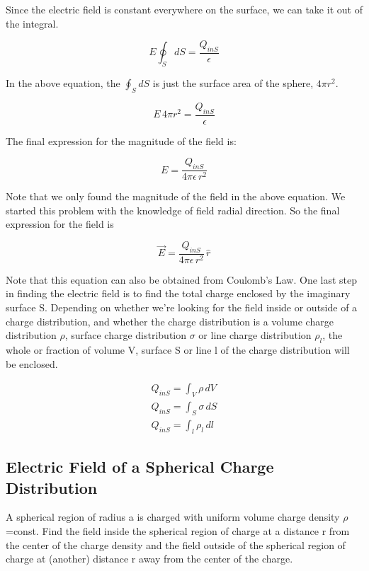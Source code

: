\documentclass{ximera}
\begin{document}
Since the electric field is constant everywhere on the surface, we can take it out of the integral. 


\begin{equation}
 E \oint_S dS = \frac{Q_{inS}}{\epsilon}
\end{equation}

In the above equation, the $\oint_S dS $ is just the surface area of the sphere, $4 \pi r^2$.


\begin{equation}
 E \, 4 \pi r^2 = \frac{Q_{inS}}{\epsilon}
\end{equation}

The final expression for the magnitude of the field is:


\begin{equation}
 E  = \frac{Q_{inS}}{4 \pi  \epsilon \, r^2}
\end{equation}

Note that we only found the magnitude of the field in the above equation. We started this problem with the knowledge of field radial direction. So the final expression for the field is

\begin{equation}
 \vec{E}  = \frac{Q_{inS}}{4 \pi  \epsilon \, r^2} \, \hat{r}
\end{equation}

Note that this equation can also be obtained from Coulomb's Law. One last step in finding the electric field is to find the total charge enclosed by the imaginary surface S. Depending on whether we're looking for the field inside or outside of a charge distribution, and whether the charge distribution is a volume charge distribution $\rho$, surface charge distribution $\sigma$ or line charge distribution $\rho_l$, the whole or fraction of volume V, surface S or line l of the charge distribution will be enclosed. 

\begin{eqnarray}
Q_{inS} = \int_V \rho \, dV \\
Q_{inS} =\int_S \sigma \, dS \\
Q_{inS} = \int_l \rho_l \, dl 
\end{eqnarray}

\subsection{Electric Field of a  Spherical Charge Distribution}


A spherical region of radius a is charged with uniform volume charge density $\rho$=const. Find the field inside the spherical region of charge at a distance r from the center of the charge density and the field outside of the spherical region of charge at (another) distance r away from the center of the charge.
\end{document}

